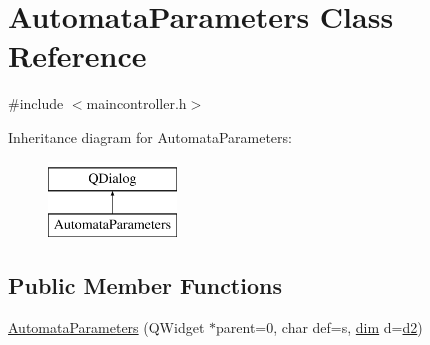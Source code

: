 \hypertarget{class_automata_parameters}{}\section{Automata\+Parameters Class Reference}
\label{class_automata_parameters}


{\ttfamily \#include $<$maincontroller.\+h$>$}

Inheritance diagram for Automata\+Parameters\+:\begin{figure}[H]
\begin{center}
\leavevmode
\includegraphics[height=2.000000cm]{class_automata_parameters}
\end{center}
\end{figure}
\subsection*{Public Member Functions}
\begin{DoxyCompactItemize}
\item 
\mbox{\hyperlink{class_automata_parameters_a67caea1bf676cb572a00da603732e7df}{Automata\+Parameters}} (Q\+Widget $\ast$parent=0, char def=\textquotesingle{}s\textquotesingle{}, \mbox{\hyperlink{automatamanager_8h_ae6fa959b9e8f9c638e0d82bf2c7dc5e7}{dim}} d=\mbox{\hyperlink{automatamanager_8h_ae6fa959b9e8f9c638e0d82bf2c7dc5e7a96ae589b7d5427dde9e5da18bbf68d86}{d2}})
\end{DoxyCompactItemize}
